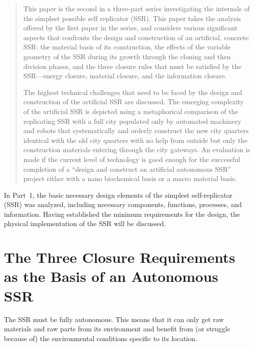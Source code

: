 
\begin{abstract}
This paper is the second in a three-part series investigating the internals 
of the simplest possible self replicator (SSR).  
This paper takes the
analysis offered by the first paper in the series, and considers various 
significant aspects that confronts the
design and construction of an artificial, concrete SSR: the material
basis of its construction, the effects of the variable geometry of the
SSR during its growth through the cloning and then division phases, and the
three closure rules that must be satisfied by the SSR---energy closure,
material closure, and the information closure.

The highest technical
challenges that need to be faced by the design and construction of the
artificial SSR are discussed. The emerging complexity of the artificial
SSR is depicted using a metaphorical comparison of the replicating SSR
with a full city populated only by automated machinery and robots that
systematically and orderly construct the new city quarters identical
with the old city quarters with no help from outside but only the
construction materials entering through the city gateways. An
evaluation is made if the current level of technology is good enough
for the successful completion of a “design and construct an artificial
autonomous SSR” project either with a nano biochemical basis or a macro
material basis. 
\end{abstract}

In Part~1, the basic necessary design elements of the simplest self-replicator (SSR) 
was analyzed, including necessary components, functions, processes, and information.
Having established the minimum requirements for the design, the physical implementation
of the SSR will be discussed.

\section{The Three Closure Requirements as the Basis of an Autonomous SSR}

The SSR must be fully autonomous. This means that it can only get raw
materials and raw parts from its environment and benefit from (or
struggle because of) the environmental conditions specific to its
location.


